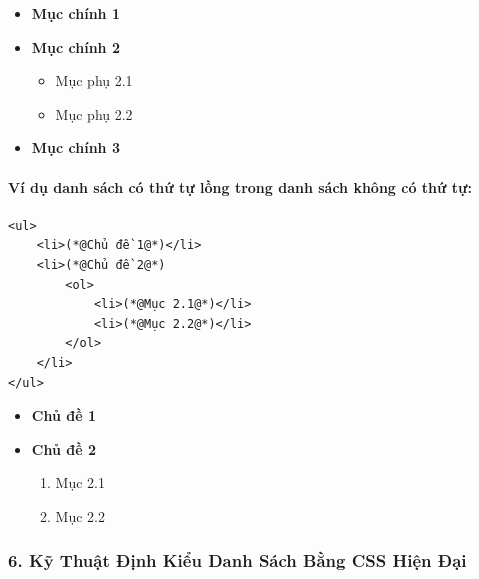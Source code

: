 \documentclass[11pt,oneside]{book}
\begin{document}
\begin{browserWindow}
\begin{itemize}[leftmargin=1.5em, itemsep=3pt, parsep=0pt]
    \item \textbf{Mục chính 1}
    \item \textbf{Mục chính 2}
    \begin{itemize}[leftmargin=1.5em, itemsep=2pt, parsep=0pt]
        \item Mục phụ 2.1
        \item Mục phụ 2.2
    \end{itemize}
    \item \textbf{Mục chính 3}
\end{itemize}
\end{browserWindow}

\paragraph{Ví dụ danh sách có thứ tự lồng trong danh sách không có thứ tự:}
\begin{codeWindow}
\begin{lstlisting}[language=HTML5]
<ul>
    <li>(*@Chủ đề 1@*)</li>
    <li>(*@Chủ đề 2@*)
        <ol>
            <li>(*@Mục 2.1@*)</li>
            <li>(*@Mục 2.2@*)</li>
        </ol>
    </li>
</ul>
\end{lstlisting}
\end{codeWindow}

\begin{browserWindow}
\begin{itemize}[leftmargin=1.5em, itemsep=3pt, parsep=0pt]
    \item \textbf{Chủ đề 1}
    \item \textbf{Chủ đề 2}
    \begin{enumerate}[leftmargin=1.5em, itemsep=2pt, parsep=0pt]
        \item Mục 2.1
        \item Mục 2.2
    \end{enumerate}
\end{itemize}
\end{browserWindow}

\subsubsection{6. Kỹ Thuật Định Kiểu Danh Sách Bằng CSS Hiện Đại}
\end{document}
